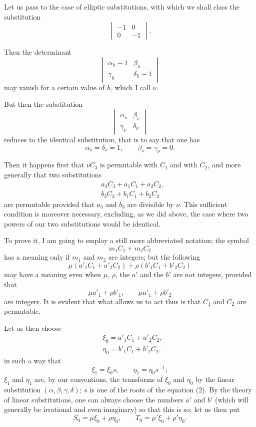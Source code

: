 \documentclass{article}
\begin{document}
Let us pass to the case of elliptic substitutions, with which we shall class the substitution
\[ \begin{vmatrix} -1 & 0 \\[1ex] 0 & -1 \end{vmatrix}. \]

Then the determinant
\[ \begin{vmatrix} \alpha_{h} - 1 & \beta_{h} \\[1ex] \gamma_{h} & \delta_{h} - 1 \end{vmatrix} \]
may vanish for a certain value of $h$, which I call $\nu$.

But then the substitution
\[ \begin{vmatrix} \alpha_{\nu} & \beta_{\nu} \\[1ex] \gamma_{\nu} & \delta_{\nu} \end{vmatrix} \]
reduces to the identical substitution, that is to say that one has
\[ \alpha_{\nu} = \delta_{\nu} = 1, \qquad \beta_{\nu} = \gamma_{\nu} = 0. \]

Then it happens first that $\nu C_{3}$ is permutable with $C_{1}$ and with $C_{2}$, and more generally that two substitutions
\[ \begin{aligned} &a_{3}C_{3} + a_{1}C_{1} + a_{2}C_{2},\\ &b_{3}C_{3} + b_{1}C_{1} + b_{2}C_{2} \end{aligned} \]
are permutable provided that $a_{3}$ and $b_{3}$ are divisible by $\nu$. This sufficient condition is moreover necessary, excluding, as we did above, the case where two powers of our two substitutions would be identical.

To prove it, I am going to employ a still more abbreviated notation; the symbol
\[ m_{1}C_{1} + m_{2}C_{2} \]
has a meaning only if $m_{1}$ and $m_{2}$ are integers; but the following
\[ \mu(a'_{1}C_{1} + a'_{2}C_{2}) + \rho(b'_{1}C_{1} + b'_{2}C_{2}) \]
may have a meaning even when $\mu$, $\rho$, the $a'$ and the $b'$ are not integers, provided that
\[ \mu a'_{1} + \rho b'_{1}, \qquad \mu a'_{1} + \rho b'_{2} \]
are integers. It is evident that what allows us to act thus is that $C_{1}$ and $C_{2}$ are permutable.

Let us then choose
\[ \begin{aligned} &\xi_{0} = a'_{1}C_{1} + a'_{2}C_{2},\\ &\eta_{0} = b'_{1}C_{1} + b'_{2}C_{2}, \end{aligned} \]
in such a way that
\[ \xi_{1} = \xi_{0}s, \qquad \eta_{1} = \eta_{0}s^{-1}; \]
$\xi_{1}$ and $\eta_{1}$ are, by our conventions, the transforms of $\xi_{0}$ and $\eta_{0}$ by the linear substitution $(\alpha, \beta, \gamma, \delta)$; $s$ is one of the roots of the equation (2). By the theory of linear substitutions, one can always choose the numbers $a'$ and $b'$ (which will generally be irrational and even imaginary) so that this is so; let us then put
\[ S_{0} = \mu\xi_{0} + \rho\eta_{0}, \qquad T_{0} = \mu'\xi_{0} + \rho'\eta_{0}. \]
\end{document}
